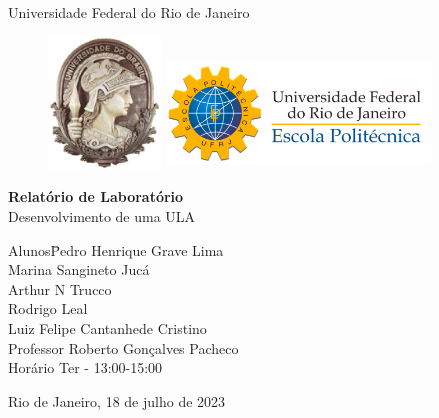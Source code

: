 \documentclass[a4paper, 12pt]{article}
\begin{document}

\begin{titlepage}
	\begin{center}
		\huge{Universidade Federal do Rio de Janeiro}

\vspace{10pt}
\begin{figure}[!ht]
\centering
\includegraphics[width=3cm]{minerva.eps}
\hspace{3cm}
\includegraphics[height=3cm, width=7cm]{poli-logo.pdf}
\end{figure}
        
        \vspace{85pt}
        
		\textbf{\LARGE{Relatório de Laboratório}}
		\large{\\
        		Desenvolvimento de uma ULA}
		\vspace{160pt}
		
	\end{center}
	
	\begin{flushleft}
		\begin{tabbing}
			Alunos\qquad\qquad\= Pedro Henrique Grave Lima\\
			\>Marina Sangineto Jucá\\
            \> Arthur N Trucco\\
            \> Rodrigo Leal \\
            \> Luiz Felipe Cantanhede Cristino \\
			Professor\> Roberto Gonçalves Pacheco \\
			Horário\> Ter - 13:00-15:00\\
		
	\end{tabbing}
		  
	\end{flushleft}
	
	\begin{center}
		\vspace{\fill}
		Rio de Janeiro, 18 de julho de 2023
	\end{center}
\end{titlepage}
\newpage
\tableofcontents
\thispagestyle{empty}
\end{document}
